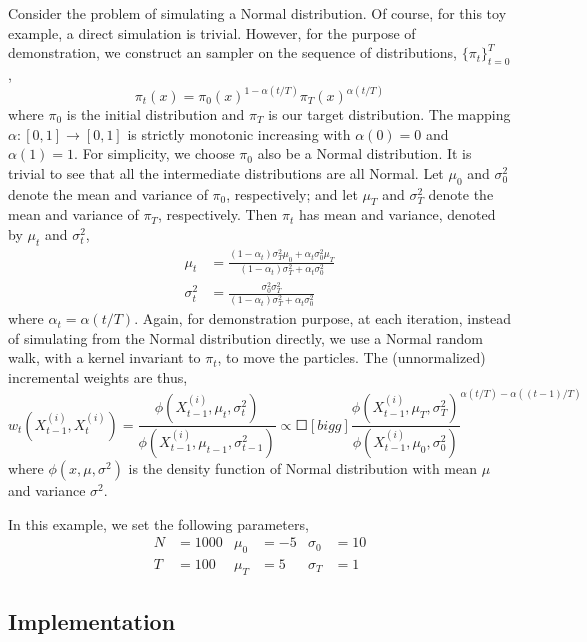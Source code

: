 Consider the problem of simulating a Normal distribution. Of course, for this
toy example, a direct simulation is trivial. However, for the purpose of
demonstration, we construct an \smc sampler on the sequence of distributions,
$\{\pi_t\}_{t=0}^T$,
\begin{equation}
  \pi_t(x) = \pi_0(x)^{1 - \alpha(t/T)}\pi_T(x)^{\alpha(t/T)}
\end{equation}
where $\pi_0$ is the initial distribution and $\pi_T$ is our target
distribution. The mapping $\alpha:[0,1]\to[0,1]$ is strictly monotonic
increasing with $\alpha(0) = 0$ and $\alpha(1) = 1$. For simplicity, we choose
$\pi_0$ also be a Normal distribution. It is trivial to see that all the
intermediate distributions are all Normal. Let $\mu_0$ and $\sigma_0^2$ denote
the mean and variance of $\pi_0$, respectively; and let $\mu_T$ and
$\sigma_T^2$ denote the mean and variance of $\pi_T$, respectively. Then
$\pi_t$ has mean and variance, denoted by $\mu_t$ and $\sigma_t^2$,
\begin{align}
  \mu_t &= \frac{(1 - \alpha_t)\sigma_T^2\mu_0 + \alpha_t\sigma_0^2\mu_T}
  {(1 - \alpha_t)\sigma_T^2 + \alpha_t\sigma_0^2} \label{eq:mini mu_t} \\
  \sigma_t^2 &= \frac{\sigma_0^2\sigma_T^2}
  {(1 - \alpha_t)\sigma_T^2 + \alpha_t\sigma_0^2} \label{eq:mini var_t}
\end{align}
where $\alpha_t = \alpha(t/T)$. Again, for demonstration purpose, at each
iteration, instead of simulating from the Normal distribution directly, we use
a Normal random walk, with a kernel invariant to $\pi_t$, to move the
particles. The (unnormalized) incremental weights are thus,
\begin{equation}
  w_t(X_{t-1}^{(i)}, X_t^{(i)}) =
  \frac{\phi(X_{t-1}^{(i)},\mu_t,\sigma_t^2)}
  {\phi(X_{t-1}^{(i)},\mu_{t-1},\sigma_{t-1}^2)}
  \propto
  \Square[bigg]{\frac{\phi(X_{t-1}^{(i)},\mu_T,\sigma_T^2)}
    {\phi(X_{t-1}^{(i)},\mu_0,\sigma_0^2)}}^{\alpha(t/T) - \alpha((t-1)/T)}
  \label{eq:mini inc_weight}
\end{equation}
where $\phi(x,\mu,\sigma^2)$ is the density function of Normal distribution
with mean $\mu$ and variance $\sigma^2$.

In this example, we set the following parameters,
\begin{align*}
  N &= 1000 & \mu_0 &= -5 & \sigma_0 &= 10 \\
  T &= 100  & \mu_T &= 5  & \sigma_T &= 1
\end{align*}

\subsection{Implementation}
\label{sub:Implementation}

